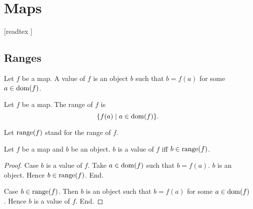 \documentclass[../../set-theory/set-theory.tex]{subfiles}
\begin{document}
  \chapter{Maps}\label{chapter:maps}


  \begin{forthel}

    [readtex ]

  \end{forthel}


  \section{Ranges}

  \begin{forthel}
    \begin{definition}
      Let $f$ be a map.
      A value of $f$ is an object $b$ such that $b = f(a)$ for some
      $a \in \operatorname{dom}(f)$.
    \end{definition}
  \end{forthel}

  \begin{forthel}
    \begin{definition}
      Let $f$ be a map.
      The range of $f$ is
      \[ \{ f(a) \mid a \in \operatorname{dom}(f) \}. \]
    \end{definition}

    Let $\operatorname{range}(f)$ stand for the range of $f$.
  \end{forthel}

  \begin{forthel}
    \begin{proposition}
      Let $f$ be a map and $b$ be an object.
      $b$ is a value of $f$ iff $b \in \operatorname{range}(f)$.
    \end{proposition}
    \begin{proof}
      Case $b$ is a value of $f$.
        Take $a \in \operatorname{dom}(f)$ such that $b = f(a)$.
        $b$ is an object.
        Hence $b \in \operatorname{range}(f)$.
      End.

      Case $b \in \operatorname{range}(f)$.
        Then $b$ is an object such that $b = f(a)$ for some $a \in \operatorname{dom}(f)$.
        Hence $b$ is a value of $f$.
      End.
    \end{proof}
  \end{forthel}
\end{document}
